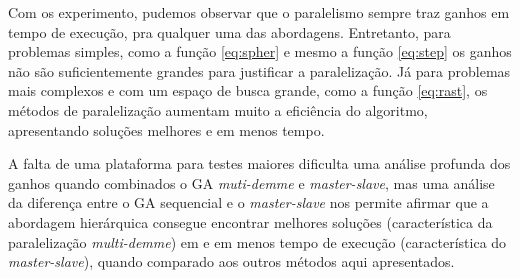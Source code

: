 \documentclass[12pt]{article}
\begin{document}
Com os experimento, pudemos observar que o paralelismo sempre traz ganhos em tempo de execução, pra qualquer uma das abordagens. Entretanto, para problemas simples, como a função \ref{eq:spher} e mesmo a função \ref{eq:step} os ganhos não são suficientemente grandes para justificar a paralelização. Já para problemas mais complexos e com um espaço de busca grande, como a função \ref{eq:rast}, os métodos de paralelização aumentam muito a eficiência do algoritmo, apresentando soluções melhores e em menos tempo. 

A falta de uma plataforma para testes maiores dificulta uma análise profunda dos ganhos quando combinados o GA \emph{muti-demme} e \emph{master-slave}, mas uma análise da diferença entre o GA sequencial e o \emph{master-slave} nos permite afirmar que a abordagem hierárquica consegue encontrar melhores soluções (característica da paralelização \emph{multi-demme}) em e em menos tempo de execução (característica do \emph{master-slave}), quando comparado aos outros métodos aqui apresentados.









\end{document}
